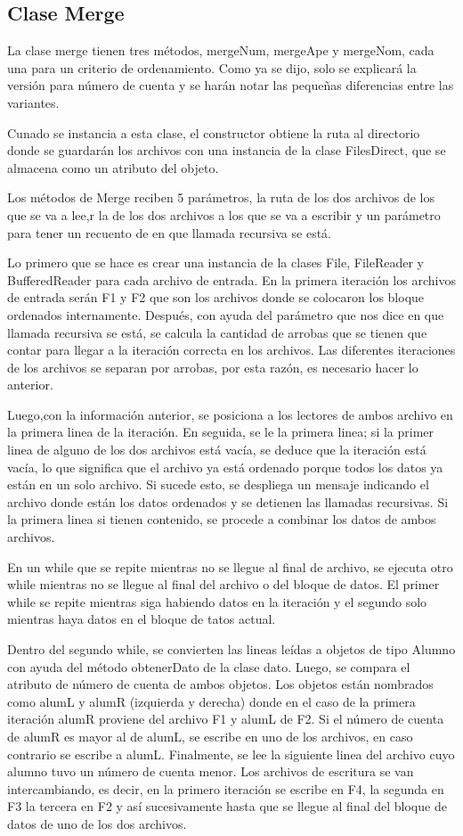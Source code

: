\documentclass[11pt]{article}
\begin{document}
\subsection{Clase Merge}
La clase merge tienen tres métodos, mergeNum, mergeApe y mergeNom, cada una para un criterio de ordenamiento. Como ya se dijo, solo se explicará la versión para número de cuenta y se harán notar las pequeñas diferencias entre las variantes.
\par
Cunado se instancia a esta clase, el constructor obtiene la ruta al directorio donde se guardarán los archivos con una instancia de la clase FilesDirect, que se almacena como un atributo del objeto.
\par
Los métodos de Merge reciben 5 parámetros, la ruta de los dos archivos de los que se va a lee,r la de los dos archivos a los que se va a escribir y un parámetro para tener un recuento de en que llamada recursiva se está. 
\par
Lo primero que se hace es crear una instancia de la clases File, FileReader y BufferedReader para cada archivo de entrada. En la primera iteración los archivos de entrada serán F1 y F2 que son los archivos donde se colocaron los bloque ordenados internamente. Después, con ayuda del parámetro que nos dice en 
que llamada recursiva se está, se calcula la cantidad de arrobas que se tienen que contar para llegar a la iteración correcta en los archivos. Las diferentes iteraciones de los archivos se separan por arrobas, por esta razón, es necesario hacer lo anterior.
\par
Luego,con la información anterior, se posiciona a los lectores de ambos archivo en la primera linea de la iteración. En seguida, se le la primera linea; si la primer linea de alguno de los dos archivos está vacía, se deduce que la iteración está vacía, lo que significa que el archivo ya está ordenado porque todos los datos ya están en un solo archivo. Si sucede esto, se despliega un mensaje indicando el archivo donde están los datos ordenados y se detienen las llamadas recursivas. Si la primera linea si tienen contenido, se procede a combinar los datos de ambos archivos.
\par
En un while que se repite mientras no se llegue al final de archivo, se ejecuta otro while mientras no se llegue al final del archivo o del bloque de datos. El primer while se repite mientras siga habiendo datos en la iteración y el segundo solo mientras haya datos en el bloque de tatos actual.
\par
Dentro del segundo while, se convierten las lineas leídas a objetos de tipo Alumno con ayuda del método obtenerDato de la clase dato. Luego, se compara el atributo de número de cuenta de ambos objetos. Los objetos están nombrados como alumL y alumR (izquierda y derecha) donde en el caso de la primera iteración alumR proviene del archivo F1 y alumL de F2. Si el número de cuenta de alumR es mayor al de alumL, se escribe en uno de los archivos, en caso contrario se escribe a alumL. Finalmente, se lee la siguiente linea del archivo cuyo alumno tuvo un número de cuenta menor. Los archivos de escritura se van intercambiando, es decir, en la primero iteración se escribe en F4, la segunda en F3 la tercera en F2 y así sucesivamente hasta que se llegue al final del bloque de datos de uno de los dos archivos.
\end{document}
